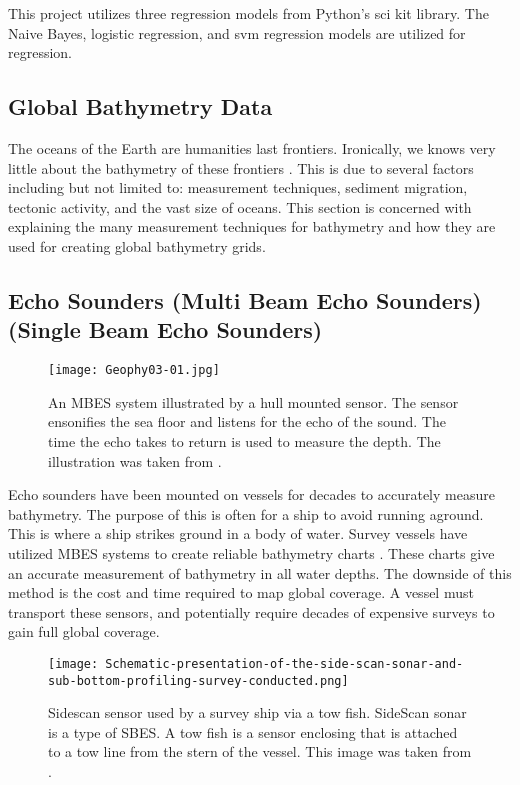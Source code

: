 
This project utilizes three regression models from Python's sci kit library.
The Naive Bayes\cite{sklearn_api}, logistic regression\cite{sklearn_api}, and svm regression\cite{sklearn_api} models are utilized for regression.

\subsection{Global Bathymetry Data}
The oceans of the Earth are humanities last frontiers.
Ironically, we knows very little about the bathymetry of these frontiers \cite{becker2009global}.
This is due to several factors including but not limited to: measurement techniques, sediment migration, tectonic activity, and the vast size of oceans.
This section is concerned with explaining the many measurement techniques for bathymetry and how they are used for creating global bathymetry grids.

\subsection{Echo Sounders (Multi Beam Echo Sounders)(Single Beam Echo Sounders) }

\begin{figure}[htp]
    \centering
    \texttt{[image: Geophy03-01.jpg]}
    \caption{An \ac{MBES} system illustrated by a hull mounted sensor.
    The sensor ensonifies the sea floor and listens for the echo of the sound.
    The time the echo takes to return is used to measure the depth. 
    The illustration was taken from \cite{monacoWeb}.}
    \label{fig:MBES}
\end{figure}

Echo sounders have been mounted on vessels for decades to accurately measure bathymetry.
The purpose of this is often for a ship to avoid running aground.
This is where a ship strikes ground in a body of water.
Survey vessels have utilized \ac{MBES} systems to create reliable bathymetry charts \cite{farr1980multibeam}.
These charts give an accurate measurement of bathymetry in all water depths.
The downside of this method is the cost and time required to map global coverage.
A vessel must transport these sensors, and potentially require decades of expensive surveys to gain full global coverage.

\begin{figure}[htp]
    \centering
    \texttt{[image: Schematic-presentation-of-the-side-scan-sonar-and-sub-bottom-profiling-survey-conducted.png]}
    \caption{Sidescan sensor used by a survey ship via a tow fish.
    SideScan sonar is a type of \ac{SBES}.
    A tow fish is a sensor enclosing that is attached to a tow line from the stern of the vessel.
    This image was taken from \cite{sakellariou2015preliminary}.}
    \label{fig:sidescandemo}
\end{figure}


